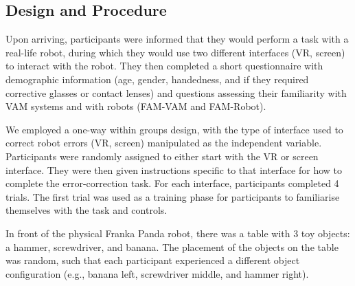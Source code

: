 \documentclass[letterpaper, 10 pt, conference]{ieeeconf}  %
\begin{document}
\subsection{Design and Procedure}
Upon arriving, participants were informed that they would perform a task with a real-life robot, during which they would use two different interfaces (VR, screen) to interact with the robot. They then completed a short questionnaire with demographic information (age, gender, handedness, and if they required corrective glasses or contact lenses) and questions assessing their familiarity with VAM systems and with robots (FAM-VAM and FAM-Robot). 

We employed a one-way within groups design, with the type of interface used to correct robot errors (VR, screen) manipulated as the independent variable. Participants were randomly assigned to either start with the VR or screen interface. They were then given instructions specific to that interface for how to complete the error-correction task. For each interface, participants completed 4 trials. The first trial was used as a training phase for participants to familiarise themselves with the task and controls. 





In front of the physical Franka Panda robot, there was a table with 3 toy objects: a hammer, screwdriver, and banana. The placement of the objects on the table was random, such that each participant experienced a different object configuration (e.g., banana left, screwdriver middle, and hammer right). 
\end{document}
